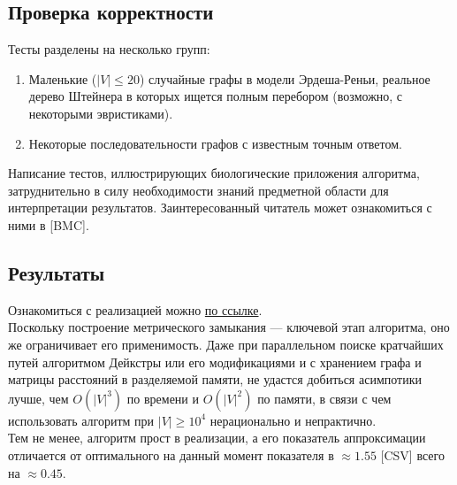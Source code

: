 \documentclass[11pt,a4paper]{report}
\def\le{\leqslant}
\def\ge{\geqslant}
\theoremstyle{definition}
\theoremstyle{definition}
\theoremstyle{definition}
\begin{document}
	\subsection{Проверка корректности}
		Тесты разделены на несколько групп:
		\begin{enumerate}
			\item Маленькие ($|V| \le 20$) случайные графы в модели Эрдеша-Реньи, реальное дерево Штейнера в которых ищется полным перебором (возможно, с некоторыми эвристиками).
			\item Некоторые последовательности графов с известным точным ответом.
		\end{enumerate}
		Написание тестов, иллюстрирующих биологические приложения алгоритма, затруднительно в силу необходимости знаний предметной области для интерпретации результатов. Заинтересованный читатель может ознакомиться с ними в [BMC].
	\subsection{Результаты}
	Ознакомиться с реализацией можно \href{https://nbviewer.jupyter.org/github/ivanov-v-v/SteinerTree/blob/master/notebooks/SteinerTree.ipynb}{по ссылке}.\\
	Поскольку построение метрического замыкания — ключевой этап алгоритма, оно же ограничивает его применимость. Даже при параллельном поиске кратчайших путей алгоритмом Дейкстры или его модификациями и с хранением графа и матрицы расстояний в разделяемой памяти, не удастся добиться асимпотики лучше, чем $O(|V|^3)$ по времени и $O(|V|^2)$ по памяти, в связи с чем использовать алгоритм при $|V| \ge 10^4 $ нерационально и непрактично.\\
	Тем не менее, алгоритм прост в реализации, а его показатель аппроксимации отличается от оптимального на данный момент показателя в $\approx 1.55$ [CSV] всего на $\approx 0.45$.
\end{document}
